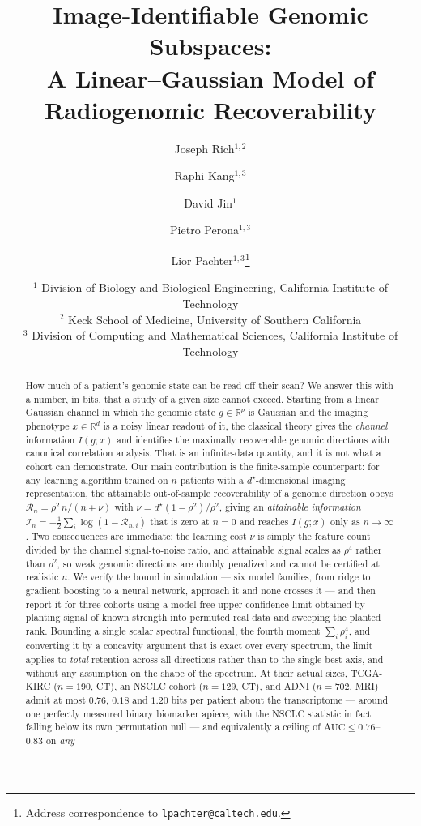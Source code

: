 \documentclass{article}
\title{Image-Identifiable Genomic Subspaces:\\
A Linear--Gaussian Model of Radiogenomic Recoverability}
\author{
Joseph Rich$^{1,2}$ \and
Raphi Kang$^{1,3}$ \and
David Jin$^{1}$ \and
Pietro Perona$^{1,3}$ \and
Lior Pachter$^{1,3}$\thanks{Address correspondence to \texttt{lpachter@caltech.edu}.}
}
\date{
\small
$^1$ Division of Biology and Biological Engineering, California Institute of Technology\\
$^2$ Keck School of Medicine, University of Southern California\\
$^3$ Division of Computing and Mathematical Sciences, California Institute of Technology
}
\newcommand{\R}{\mathbb{R}}
\begin{document}
\maketitle

\begin{abstract}
How much of a patient's genomic state can be read off their scan? We answer this
with a number, in bits, that a study of a given size cannot exceed. Starting
from a linear--Gaussian channel in which the genomic state $g\in\R^p$ is
Gaussian and the imaging phenotype $x\in\R^d$ is a noisy linear readout of it,
the classical theory gives the \emph{channel} information $I(g;x)$ and identifies
the maximally recoverable genomic directions with canonical correlation
analysis. That is an infinite-data quantity, and it is not what a cohort can
demonstrate. Our main contribution is the finite-sample counterpart: for any
learning algorithm trained on $n$ patients with a $d^\star$-dimensional imaging
representation, the attainable out-of-sample recoverability of a genomic
direction obeys
$\mathcal{R}_n = \rho^2\,n/(n+\nu)$ with $\nu = d^\star(1-\rho^2)/\rho^2$, giving
an \emph{attainable information} $\mathcal{I}_n =
-\tfrac12\sum_i\log(1-\mathcal{R}_{n,i})$ that is zero at $n=0$ and reaches
$I(g;x)$ only as $n\to\infty$. Two consequences are immediate: the learning cost
$\nu$ is simply the feature count divided by the channel signal-to-noise ratio,
and attainable signal scales as $\rho^4$ rather than $\rho^2$, so weak genomic
directions are doubly penalized and cannot be certified at realistic $n$. We
verify the bound in simulation --- six model families, from ridge to gradient
boosting to a neural network, approach it and none crosses it --- and then
report it for three cohorts using a model-free upper confidence limit obtained
by planting signal of known strength into permuted real data and sweeping the
planted rank. Bounding a single scalar spectral functional, the fourth moment
$\sum_i\rho_i^4$, and converting it by a concavity argument that is exact over
every spectrum, the limit applies to \emph{total} retention across all
directions rather than to the single best axis, and without any assumption on
the shape of the spectrum. At their actual sizes, TCGA-KIRC ($n=190$, CT), an
NSCLC cohort ($n=129$, CT), and ADNI ($n=702$, MRI) admit at most $0.76$,
$0.18$ and $1.20$ bits per patient about the transcriptome --- around one
perfectly measured binary biomarker apiece, with the NSCLC statistic in fact
falling below its own permutation null --- and
equivalently a ceiling of $\mathrm{AUC}\le 0.76$--$0.83$ on \emph{any}

\end{abstract}
\end{document}
